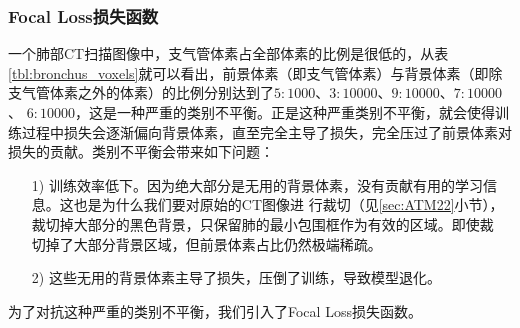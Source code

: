 \subsubsection{Focal Loss损失函数}

一个肺部CT扫描图像中，支气管体素占全部体素的比例是很低的，从表\ref{tbl:bronchus_voxels}就可以看出，前景体素（即支气管体素）与背景体素（即除支气管体素之外的体素）的比例分别达到了$5:1000$、$3:10000$、$9:10000$、$7:10000$、 $6:10000$，这是一种严重的类别不平衡。正是这种严重类别不平衡，就会使得训练过程中损失会逐渐偏向背景体素，直至完全主导了损失，完全压过了前景体素对损失的贡献。类别不平衡会带来如下问题：
\begin{enumerate}
	\item[1)]训练效率低下。因为绝大部分是无用的背景体素，没有贡献有用的学习信息。这也是为什么我们要对原始的CT图像进
					行裁切（见\ref{sec:ATM22}小节），裁切掉大部分的黑色背景，只保留肺的最小包围框作为有效的区域。即使裁
					切掉了大部分背景区域，但前景体素占比仍然极端稀疏。
	\item[2)]这些无用的背景体素主导了损失，压倒了训练，导致模型退化。
\end{enumerate}
为了对抗这种严重的类别不平衡，我们引入了Focal Loss损失函数\cite{Lin2017FocalLF}。

